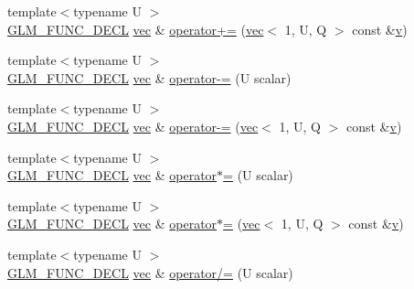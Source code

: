 \begin{DoxyCompactItemize}
\item 
{\footnotesize template$<$typename U $>$ }\\\hyperlink{setup_8hpp_ab2d052de21a70539923e9bcbf6e83a51}{G\+L\+M\+\_\+\+F\+U\+N\+C\+\_\+\+D\+E\+CL} \hyperlink{structglm_1_1vec}{vec} \& \hyperlink{structglm_1_1vec_3_011_00_01_t_00_01_q_01_4_a658d20bd2f3896cd459c5569fbc086ae}{operator+=} (\hyperlink{structglm_1_1vec}{vec}$<$ 1, U, Q $>$ const \&\hyperlink{_s_d_l__opengl_8h_a10a82eabcb59d2fcd74acee063775f90}{v})
\item 
{\footnotesize template$<$typename U $>$ }\\\hyperlink{setup_8hpp_ab2d052de21a70539923e9bcbf6e83a51}{G\+L\+M\+\_\+\+F\+U\+N\+C\+\_\+\+D\+E\+CL} \hyperlink{structglm_1_1vec}{vec} \& \hyperlink{structglm_1_1vec_3_011_00_01_t_00_01_q_01_4_aa5f48c43d3c71aacd712fedcdf05362f}{operator-\/=} (U scalar)
\item 
{\footnotesize template$<$typename U $>$ }\\\hyperlink{setup_8hpp_ab2d052de21a70539923e9bcbf6e83a51}{G\+L\+M\+\_\+\+F\+U\+N\+C\+\_\+\+D\+E\+CL} \hyperlink{structglm_1_1vec}{vec} \& \hyperlink{structglm_1_1vec_3_011_00_01_t_00_01_q_01_4_afca22c18c34addd806151214edd57cc2}{operator-\/=} (\hyperlink{structglm_1_1vec}{vec}$<$ 1, U, Q $>$ const \&\hyperlink{_s_d_l__opengl_8h_a10a82eabcb59d2fcd74acee063775f90}{v})
\item 
{\footnotesize template$<$typename U $>$ }\\\hyperlink{setup_8hpp_ab2d052de21a70539923e9bcbf6e83a51}{G\+L\+M\+\_\+\+F\+U\+N\+C\+\_\+\+D\+E\+CL} \hyperlink{structglm_1_1vec}{vec} \& \hyperlink{structglm_1_1vec_3_011_00_01_t_00_01_q_01_4_ac3400fb8176cefe78c52da5a9188446c}{operator$\ast$=} (U scalar)
\item 
{\footnotesize template$<$typename U $>$ }\\\hyperlink{setup_8hpp_ab2d052de21a70539923e9bcbf6e83a51}{G\+L\+M\+\_\+\+F\+U\+N\+C\+\_\+\+D\+E\+CL} \hyperlink{structglm_1_1vec}{vec} \& \hyperlink{structglm_1_1vec_3_011_00_01_t_00_01_q_01_4_aa070c2898cf88a73e4f60581e77bce44}{operator$\ast$=} (\hyperlink{structglm_1_1vec}{vec}$<$ 1, U, Q $>$ const \&\hyperlink{_s_d_l__opengl_8h_a10a82eabcb59d2fcd74acee063775f90}{v})
\item 
{\footnotesize template$<$typename U $>$ }\\\hyperlink{setup_8hpp_ab2d052de21a70539923e9bcbf6e83a51}{G\+L\+M\+\_\+\+F\+U\+N\+C\+\_\+\+D\+E\+CL} \hyperlink{structglm_1_1vec}{vec} \& \hyperlink{structglm_1_1vec_3_011_00_01_t_00_01_q_01_4_a0b6b057cf632327a79e33dc759773855}{operator/=} (U scalar)

\end{DoxyCompactItemize}
